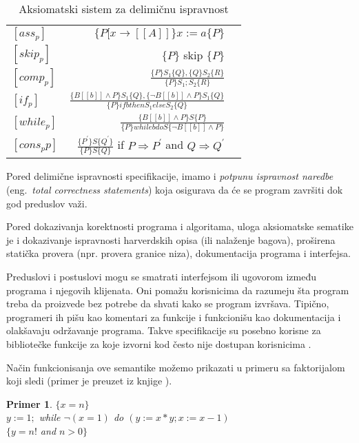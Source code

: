 \documentclass[a4paper]{article}
\newtheorem{primer}{Primer}[section]
\begin{document}
{\begin{table}
    \begin{center}
        \begin{tabular}{lrc}\hline
        \hline
        \hline
        $[ass_{p}] $ & $ \{ P[x \rightarrow [\![A]\!]\} x:= a \{P\}$    \\  [6pt]
        $[skip_{p}] $ & $ \{P\}$ skip  $ \{P\}$   \\ [6pt]
         $[comp_{p}] $ & $  \frac{\{P\}S_1\{Q\},\{Q\}S_2\{R\}}{\{P\}S_1;S_2\{R\}} $ \\[6pt]
            $[if_{p}] $ & $  \frac{\{B[\![b]\!]\land P\}S_1\{Q\},\{\neg B[\![b]\!]\land P\}S_1\{Q\}}{\{P\} if b then S_1 else S_2\{Q\}} $ \\ [6pt]
        $[while_{p}] $ & $  \frac{\{B[\![b]\!]\land P\}S\{P\}}{\{P\} while b do S \{\neg B[\![b]\!]\land P\}} $ \\ [6pt]
          $[cons_p{p}] $ & $  \frac{\{P^{'}\}S\{Q^{'}\}}{\{P\}S\{Q\}} $ if $ P \Rightarrow	 P^{'} $ and $ Q \Rightarrow	 Q^{'} $  \\ [6pt]
          \hline \hline
        \end{tabular}
        \caption{Aksiomatski sistem za delimičnu ispravnost}\label{tab:a}
    \end{center}
\end{table}






Pored delimične ispravnosti specifikacije, imamo i \textit {potpunu ispravnost naredbe } (eng.~{\em  total correctness statements}) koja osigurava da će se program završiti dok god preduslov važi. 

Pored dokazivanja korektnosti programa i algoritama, uloga aksiomatske sematike je i dokazivanje ispravnosti harverdskih opisa (ili nalaženje bagova), proširena statička provera (npr. provera granice niza), dokumentacija programa i interfejsa.

Preduslovi i postuslovi mogu se smatrati interfejsom ili ugovorom između programa i njegovih klijenata. Oni pomažu korisnicima da razumeju šta program treba da proizvede bez potrebe da shvati kako se program izvršava. Tipično, programeri ih pišu kao komentari za funkcije i
funkcionišu kao dokumentacija i olakšavaju održavanje programa. Takve specifikacije su posebno
korisne za bibliotečke funkcije za koje izvorni kod često nije dostupan korisnicima \cite{adrian}. 

Način funkcionisanja ove semantike možemo prikazati u primeru sa faktorijalom koji sledi (primer je preuzet iz knjige \cite{nielson} ). \\
\begin{primer}
$\{ x=n \} $ \\
$  y := 1; $
 while $ \neg(x=1) $  do $ (y := x*y; x := x-1) $\\
$ \{ y=n!$ and $ n > 0 \} $ \\
 

\end{primer}}
\end{document}
